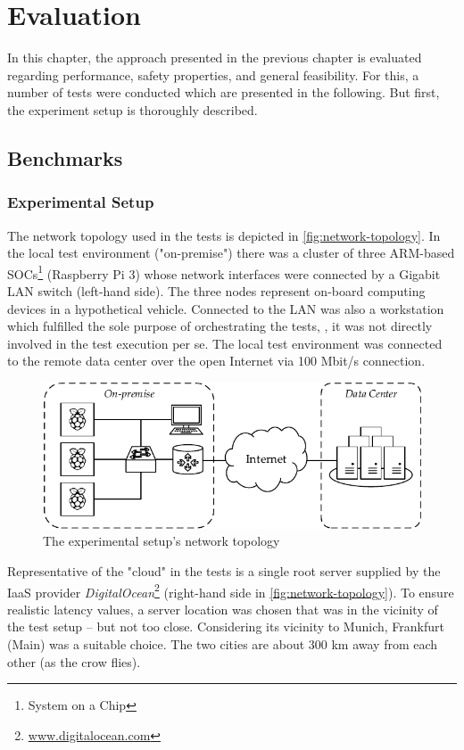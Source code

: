
\chapter{Evaluation}\label{chapter:evaluation}

In this chapter, the approach presented in the previous chapter is evaluated regarding performance, safety properties, and general feasibility. For this, a number of tests were conducted which are presented in the following. But first, the experiment setup is thoroughly described.

\section{Benchmarks}

\subsection{Experimental Setup}\label{sec:testsetup}

The network topology used in the tests is depicted in \autoref{fig:network-topology}. In the local test environment ("on-premise") there was a cluster of three ARM-based SOCs\footnote{System on a Chip} (Raspberry Pi 3) whose network interfaces were connected by a Gigabit LAN switch (left-hand side). The three nodes represent on-board computing devices in a hypothetical vehicle. Connected to the LAN was also a workstation which fulfilled the sole purpose of orchestrating the tests, \ie , it was not directly involved in the test execution per se. The local test environment was connected to the remote data center over the open Internet via 100 Mbit/s connection.

\begin{figure}[htpb]
  \centering
  \includegraphics[width=\textwidth]{figures/network-setup}
  \caption[Network topology of the experimental setup]{The experimental setup's network topology}\label{fig:network-topology}
\end{figure}
%
Representative of the "cloud" in the tests is a single root server supplied by the IaaS provider \emph{DigitalOcean}\footnote{\url{www.digitalocean.com}} (right-hand side in \autoref{fig:network-topology}). To ensure realistic latency values, a server location was chosen that was in the vicinity of the test setup -- but not too close. Considering its vicinity to Munich, Frankfurt (Main) was a suitable choice. The two cities are about 300 km away from each other (as the crow flies).

